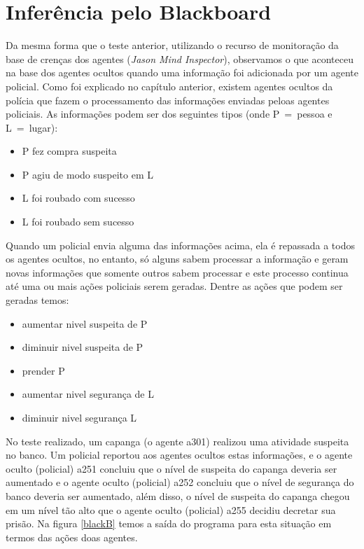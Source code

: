 \section{Inferência pelo Blackboard}
Da mesma forma que o teste anterior, utilizando o recurso de monitoração da base de crenças dos agentes (\emph{Jason Mind Inspector}), observamos o que aconteceu na base dos agentes ocultos quando uma informação foi adicionada por um agente policial.
Como foi explicado no capítulo anterior, existem agentes ocultos da polícia que fazem o processamento das informações enviadas peloas agentes policiais. As informações podem ser dos seguintes tipos (onde P~=~pessoa e L~=~lugar):
\begin{itemize}
\item P fez compra suspeita
\item P agiu de modo suspeito em L
\item L foi roubado com sucesso
\item L foi roubado sem sucesso
\end{itemize}
Quando um policial envia alguma das informações acima, ela é repassada a todos os agentes ocultos, no entanto, só alguns sabem processar a informação e geram novas informações que somente outros sabem processar e este processo continua até uma ou mais ações policiais serem geradas.
Dentre as ações que podem ser geradas temos:
\begin{itemize}
\item aumentar nivel suspeita de P
\item diminuir nivel suspeita de P
\item prender P
\item aumentar nivel segurança de L
\item diminuir nivel segurança L 
\end{itemize}
No teste realizado, um capanga (o agente a301) realizou uma atividade suspeita no banco. Um policial reportou aos agentes ocultos estas informações, e o agente oculto (policial) a251 concluiu que o nível de suspeita do capanga deveria ser aumentado e o agente oculto (policial) a252 concluiu que o nível de segurança do banco deveria ser aumentado, além disso, o nível de suspeita do capanga chegou em um nível tão alto que o agente oculto (policial) a255 decidiu decretar sua prisão.
Na figura \ref{blackB} temos a saída do programa para esta situação em termos das ações doas agentes.


